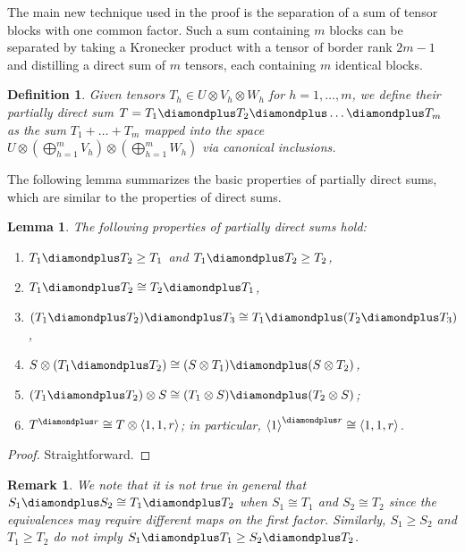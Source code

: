 \documentclass[11pt,letterpaper]{article}
\newtheorem{definition}[theorem]{Definition}\AddToHook{env/definition/begin}{\crefalias{theorem}{definition}}
\newtheorem{lemma}[theorem]{Lemma}\AddToHook{env/lemma/begin}{\crefalias{theorem}{lemma}}
\newtheorem{remark}[theorem]{Remark}\AddToHook{env/remark/begin}{\crefalias{theorem}{remark}}
\numberwithin{equation}{section}
\begin{document}
The main new technique used in the proof is the separation of a sum of tensor blocks with one common factor.
Such a sum containing $m$ blocks can be separated by taking a Kronecker product with a tensor of border rank $2m - 1$ and distilling a direct sum of $m$ tensors, each containing $m$ identical blocks.


\begin{definition}\label{def:partial-direct-sum}
  Given tensors $T_h \in U \otimes V_h \otimes W_h$ for $h=1,\dots,m$, we define their \emph{partially direct sum} $T = T_1 \diamondplus T_2\diamondplus\dots\diamondplus T_m$ as the sum $T_1+\dots+T_m$ mapped into the space $U \otimes \left(\bigoplus_{h=1}^m V_h\right) \otimes \left(\bigoplus_{h=1}^m W_h\right)$ via canonical inclusions.
\end{definition}

The following lemma summarizes the basic properties of partially direct sums, which are similar to the properties of direct sums.

\begin{lemma}\label{diamondplus-basic}
The following properties of partially direct sums hold:
  \begin{enumerate}
    \item $T_1 \diamondplus T_2 \geq T_1$ and $T_1 \diamondplus T_2 \geq T_2$,
    \item $T_1 \diamondplus T_2 \cong T_2 \diamondplus T_1$,
    \item $(T_1 \diamondplus T_2) \diamondplus T_3 \cong T_1 \diamondplus (T_2 \diamondplus T_3)$,
    \item $S \otimes (T_1 \diamondplus T_2) \cong (S \otimes T_1) \diamondplus (S \otimes T_2)$,
    \item $(T_1 \diamondplus T_2) \otimes S \cong (T_1 \otimes S) \diamondplus (T_2 \otimes S)$;
    \item $T^{\diamondplus r} \cong T \otimes \left<1,1,r\right>$; in particular, $\left<1\right>^{\diamondplus r} \cong \left<1,1,r\right>$.
  \end{enumerate}
\end{lemma}
\begin{proof}
  Straightforward.
\end{proof}

\begin{remark}\label{rem:partial-sum-equivalence}
We note that it is not true in general that $S_1 \diamondplus S_2 \cong T_1 \diamondplus T_2$ when $S_1 \cong T_1$ and
$S_2 \cong T_2$ since the equivalences may require different maps on the first factor.
Similarly, $S_1 \geq S_2$ and $T_1
\geq T_2$ do not imply $S_1 \diamondplus T_1 \geq S_2 \diamondplus T_2$.
\end{remark}
\end{document}
